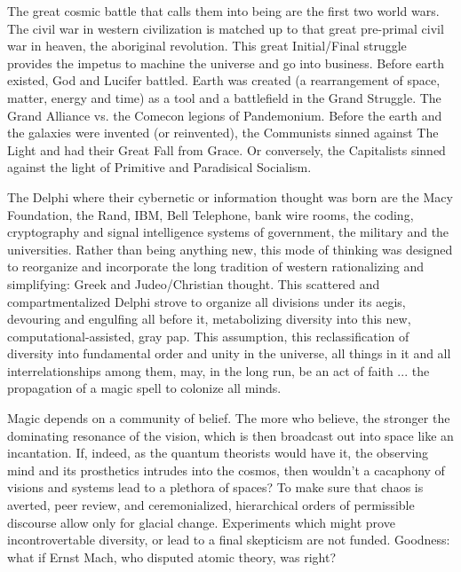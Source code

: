 The great cosmic battle that calls them into being are the first two world wars. The civil war in western civilization is matched up to that great pre-primal civil war in heaven, the aboriginal revolution. This great Initial\slash Final struggle provides the impetus to machine the universe and go into business. Before earth existed, God and Lucifer battled. Earth was created (a rearrangement of space, matter, energy and time) as a tool and a battlefield in the Grand Struggle. The Grand Alliance vs. the Comecon legions of Pandemonium. Before the earth and the galaxies were invented (or reinvented), the Communists sinned against The Light and had their Great Fall from Grace. Or conversely, the Capitalists sinned against the light of Primitive and Paradisical Socialism.

The Delphi where their cybernetic or information thought was born are the Macy Foundation, the Rand, IBM, Bell Telephone, bank wire rooms, the coding, cryptography and signal intelligence systems of government, the military and the universities. Rather than being anything new, this mode of thinking was designed to reorganize and incorporate the long tradition of western rationalizing and simplifying: Greek and Judeo/Christian thought. This scattered and compartmentalized Delphi strove to organize all divisions under its aegis, devouring and engulfing all before it, metabolizing diversity into this new, computational-assisted, gray pap. This assumption, this reclassification of diversity into fundamental order and unity in the universe, all things in it and all interrelationships among them, may, in the long run, be an act of faith ... the propagation of a magic spell to colonize all minds.

Magic depends on a community of belief. The more who believe, the stronger the dominating resonance of the vision, which is then broadcast out into space like an incantation. If, indeed, as the quantum theorists would have it, the observing mind and its prosthetics intrudes into the cosmos, then wouldn't a cacaphony of visions and systems lead to a plethora of spaces? To make sure that chaos is averted, peer review, and ceremonialized, hierarchical orders of permissible discourse allow only for glacial change. Experiments which might prove incontrovertable diversity, or lead to a final skepticism are not funded. Goodness: what if Ernst Mach, who disputed atomic theory, was right?


